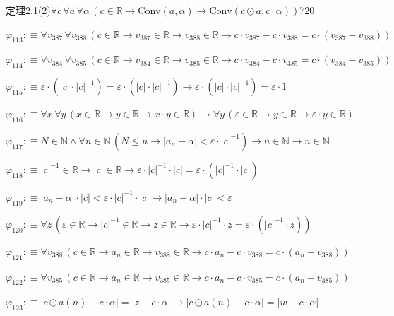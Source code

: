 \begin{fullproof}{定理2.1(2)}{$\forall c\,\forall a\,\forall \alpha\,(c \in \mathbb{R} \to \mathrm{Conv}(a,\alpha) \to \mathrm{Conv}(c \odot a,c \cdot \alpha))$}{720}
\begin{abbrevlist}
\item $\varphi_{113} :\equiv \forall v_{387}\,\forall v_{388}\,(c \in \mathbb{R} \to v_{387} \in \mathbb{R} \to v_{388} \in \mathbb{R} \to c \cdot v_{387} - c \cdot v_{388} = c \cdot (v_{387} - v_{388}))$
\item $\varphi_{114} :\equiv \forall v_{384}\,\forall v_{385}\,(c \in \mathbb{R} \to v_{384} \in \mathbb{R} \to v_{385} \in \mathbb{R} \to c \cdot v_{384} - c \cdot v_{385} = c \cdot (v_{384} - v_{385}))$
\item $\varphi_{115} :\equiv \varepsilon \cdot (\lvert c \rvert \cdot \lvert c \rvert^{-1}) = \varepsilon \cdot (\lvert c \rvert \cdot \lvert c \rvert^{-1}) \to \varepsilon \cdot (\lvert c \rvert \cdot \lvert c \rvert^{-1}) = \varepsilon \cdot 1$
\item $\varphi_{116} :\equiv \forall x\,\forall y\,(x \in \mathbb{R} \to y \in \mathbb{R} \to x \cdot y \in \mathbb{R}) \to \forall y\,(\varepsilon \in \mathbb{R} \to y \in \mathbb{R} \to \varepsilon \cdot y \in \mathbb{R})$
\item $\varphi_{117} :\equiv N \in \mathbb{N} \land \forall n \in \mathbb{N}\,(N \leq n \to \lvert a_{n} - \alpha \rvert < \varepsilon \cdot \lvert c \rvert^{-1}) \to n \in \mathbb{N} \to n \in \mathbb{N}$
\item $\varphi_{118} :\equiv \lvert c \rvert^{-1} \in \mathbb{R} \to \lvert c \rvert \in \mathbb{R} \to \varepsilon \cdot \lvert c \rvert^{-1} \cdot \lvert c \rvert = \varepsilon \cdot (\lvert c \rvert^{-1} \cdot \lvert c \rvert)$
\item $\varphi_{119} :\equiv \lvert a_{n} - \alpha \rvert \cdot \lvert c \rvert < \varepsilon \cdot \lvert c \rvert^{-1} \cdot \lvert c \rvert \to \lvert a_{n} - \alpha \rvert \cdot \lvert c \rvert < \varepsilon$
\item $\varphi_{120} :\equiv \forall z\,(\varepsilon \in \mathbb{R} \to \lvert c \rvert^{-1} \in \mathbb{R} \to z \in \mathbb{R} \to \varepsilon \cdot \lvert c \rvert^{-1} \cdot z = \varepsilon \cdot (\lvert c \rvert^{-1} \cdot z))$
\item $\varphi_{121} :\equiv \forall v_{388}\,(c \in \mathbb{R} \to a_{n} \in \mathbb{R} \to v_{388} \in \mathbb{R} \to c \cdot a_{n} - c \cdot v_{388} = c \cdot (a_{n} - v_{388}))$
\item $\varphi_{122} :\equiv \forall v_{385}\,(c \in \mathbb{R} \to a_{n} \in \mathbb{R} \to v_{385} \in \mathbb{R} \to c \cdot a_{n} - c \cdot v_{385} = c \cdot (a_{n} - v_{385}))$
\item $\varphi_{123} :\equiv \lvert c \odot a(n) - c \cdot \alpha \rvert = \lvert z - c \cdot \alpha \rvert \to \lvert c \odot a(n) - c \cdot \alpha \rvert = \lvert w - c \cdot \alpha \rvert$

\end{abbrevlist}
\end{fullproof}
